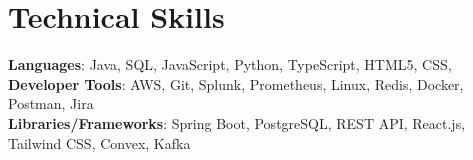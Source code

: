\documentclass[letterpaper,11pt]{article}
\begin{document}
\section{Technical Skills}
\begin{itemize}[leftmargin=0.15in, label={}]
  \small{\item{   
    \textbf{Languages}: Java, SQL, JavaScript, Python, TypeScript, HTML5, CSS,  \\[1mm]
    \textbf{Developer Tools}: AWS, Git, Splunk, Prometheus, Linux, Redis, Docker, Postman, Jira \\[1mm]
    \textbf{Libraries/Frameworks}: Spring Boot, PostgreSQL, REST API, React.js, Tailwind CSS, Convex, Kafka \\[1mm]
  }}
\end{itemize}
\vspace{-16pt}
\vspace{3pt}
\vspace{10pt}

\vspace{-15pt}
\end{document}
